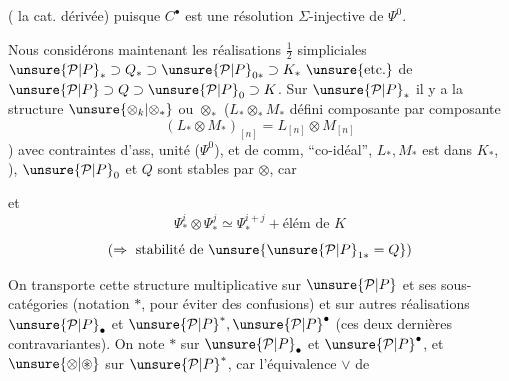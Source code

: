 ( la cat. dérivée) puisque $C^\bullet$ est une résolution $\Sigma$-injective de $\Psi^0$.


Nous considérons maintenant les réalisations $\tfrac12$ simpliciales $\unsure{\mathcal P|P}_*\supset Q_*\supset \unsure{\mathcal P|P}_{0*}\supset K_*\ \unsure{\text{etc.}}$ de $\unsure{\mathcal P|P}\supset Q\supset \unsure{\mathcal P|P}_0\supset K$. Sur $\unsure{\mathcal P|P}_*$ il y a la structure $\unsure{\otimes_k|\otimes_*}$ ou $\otimes_*$
($L_*\otimes_*M_*$ défini composante par composante
\[
(L_*\otimes M_*)_{[n]}=L_{[n]}\otimes M_{[n]}
\]
)
avec contraintes d'ass, unité ($\Psi^0$), et de comm,     ``co-idéal'',   $L_*,M_*$ est dans $K_*$, ), $\unsure{\mathcal P|P}_0$ et $Q$ sont stables par $\otimes$, car



et
\[
\Psi^i_*\otimes\Psi^j_*\simeq\Psi^{i+j}_*+\text{élém de }K
\]
\[
(\Rightarrow\text{ stabilité de }\unsure{\unsure{\mathcal P|P}_{1*}=Q})
\]

On transporte cette structure multiplicative sur $\unsure{\mathcal P|P}$ et ses sous-catégories (notation $*$, pour éviter des confusions) et sur autres réalisations $\unsure{\mathcal P|P}_\bullet$ et $\unsure{\mathcal P|P}^*,\unsure{\mathcal P|P}^\bullet$ (ces deux dernières contravariantes). On note $*$ sur $\unsure{\mathcal P|P}_\bullet$ et $\unsure{\mathcal P|P}^\bullet$, et $\unsure{\otimes|\mathbin{\circledast}}$ sur $\unsure{\mathcal P|P}^*$, car l'équivalence $\vee$ de

